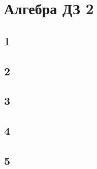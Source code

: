 	\newpage
	\section{Алгебра ДЗ 2}
		\subsection{1}	
		\subsection{2}	
		\subsection{3}	
		\subsection{4}	
		\subsection{5}	